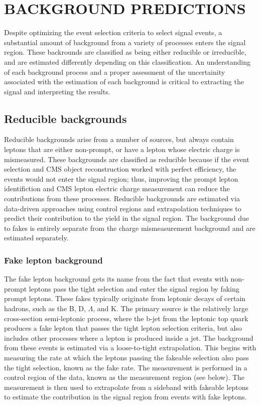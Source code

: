 %
%

\chapter{BACKGROUND PREDICTIONS}
\label{chap:background}
Despite optimizing the event selection criteria to select signal events, a substantial amount of background from a variety of processes enters the signal region.
These backrounds are classified as being either reducible or irreducible, and are estimated differently depending on this classification. An understanding
of each background process and a proper assessment of the uncertainity associated with the estimation of each background is critical to extracting the signal and interpreting
the results. 

\section{Reducible backgrounds}
Reducible backgrounds arise from a number of sources, but always contain leptons that are either non-prompt, or have a lepton whose electric charge is mismeasured.
These backgrounds are classified as reducible because if the event selection and CMS object reconstruction worked with perfect efficiency, the events would not
enter the signal region; thus, improving the prompt lepton identifiction and CMS lepton electric charge measurement can reduce the contributions from these processes.
Reducible backgrounds are estimated via data-driven approaches using control regions and extrapolation techniques to predict their contribution to the yield in the
signal region. The background due to fakes is entirely separate from the charge mismeasurement background and are estimated separately. 

\subsection{Fake lepton background} 
The fake lepton background gets its name from the fact that events with non-prompt leptons pass the tight selection and enter the signal region by faking prompt leptons. These
fakes typically originate from leptonic decays of certain hadrons, such as the B, D, $\Lambda$, and K. The primary source is the relatively large cross-section semi-leptonic \ttbar
process, where the b-jet from the leptonic top quark produces a fake lepton that passes the tight lepton selection criteria, but also includes other processes where a lepton
is produced inside a jet. The background from these events is estimated via a loose-to-tight extrapolation. This begins with measuring the rate at which the leptons passing
the fakeable selection also pass the tight selection, known as the fake rate. The measurement is performed in a control region of the data, known as the measurement region (see below).
The measurement is then used to extrapolate from a sideband with fakeable leptons to estimate the contribution in the signal region 
from events with fake leptons. 


